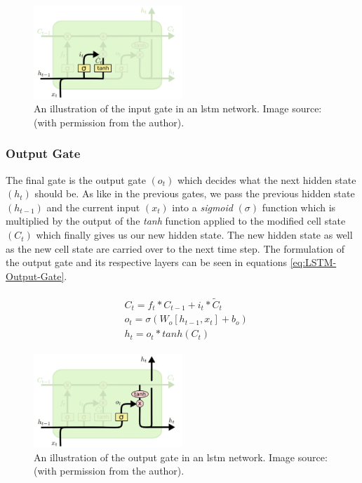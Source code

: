 \begin{figure}[hbt!]
    \centering
    \includegraphics[width=0.5\textwidth]{Images/Chapter 3/LSTM/LSTM-Input-Gate-Illustration.pdf}
    \caption{An illustration of the input gate in an \gls{lstm} network. Image source: \cite{Colah} (with permission from the author).}
    \label{fig:LSTM-Input-Gate-Illustration}
\end{figure}

\subsubsection{Output Gate}
\label{subsubsec:Background-Information:Forecasting-Models:Long-Short-Term-Memory-Networks:Output-Gate}
The final gate is the output gate $(o_t)$ which decides what the next hidden state $(h_t)$ should be. As like in the previous gates, we pass the previous hidden state $(h_{t-1})$ and the current input $(x_t)$ into a \textit{sigmoid} $(\sigma)$ function which is multiplied by the output of the \textit{tanh} function applied to the modified cell state $(C_t)$ which finally gives us our new hidden state. The new hidden state as well as the new cell state are carried over to the next time step. The formulation of the output gate and its respective layers can be seen in equations \ref{eq:LSTM-Output-Gate}.

\begin{align}
    \begin{split}
        & C_t = f_t * C_{t-1} + i_t * \tilde{C}_t \\
        & o_t = \sigma (W_o \left[h_{t-1}, x_t \right] + b_o) \\
        & h_t = o_t * tanh(C_t)
    \end{split}
\label{eq:LSTM-Output-Gate}
\end{align}

\begin{figure}[H]
    \centering
    \includegraphics[width=0.5\textwidth]{Images/Chapter 3/LSTM/LSTM-Output-Gate-Illustration.pdf}
    \caption{An illustration of the output gate in an \gls{lstm} network. Image source: \cite{Colah}  (with permission from the author).}
    \label{fig:LSTM-Output-Gate-Illustration}
\end{figure}

